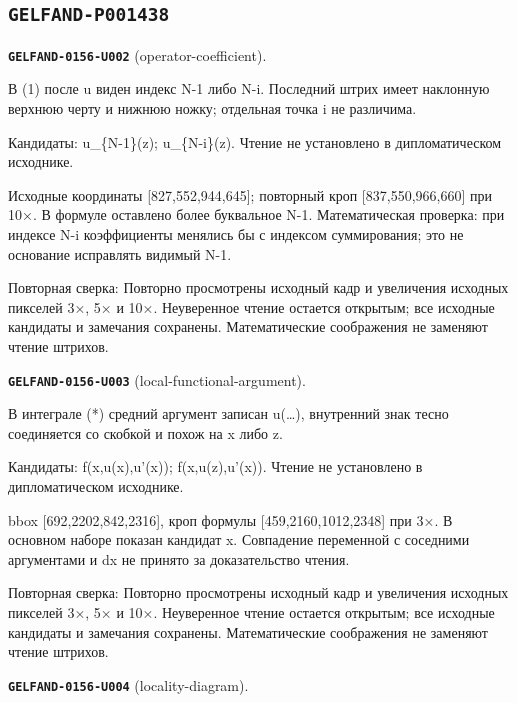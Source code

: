 \subsection*{\texttt{GELFAND-P001438}}
\par\noindent\leavevmode{}\label{GELFAND-0156-U002}\label{GELFAND-P001438:operator-coefficient}\textbf{\texttt{GELFAND-0156-U002}} (operator-coefficient).\nopagebreak[4]\par
В (1) после u виден индекс N-1 либо N-i. Последний штрих имеет наклонную верхнюю черту и нижнюю ножку; отдельная точка i не различима.\par
Кандидаты: u\_\{N-1\}(z); u\_\{N-i\}(z). Чтение не установлено в дипломатическом исходнике.\par
Исходные координаты [827,552,944,645]; повторный кроп [837,550,966,660] при 10×. В формуле оставлено более буквальное N-1. Математическая проверка: при индексе N-i коэффициенты менялись бы с индексом суммирования; это не основание исправлять видимый N-1.\par
Повторная сверка: Повторно просмотрены исходный кадр и увеличения исходных пикселей 3×, 5× и 10×. Неуверенное чтение остается открытым; все исходные кандидаты и замечания сохранены. Математические соображения не заменяют чтение штрихов.\par\medskip
\par\noindent\leavevmode{}\label{GELFAND-0156-U003}\label{GELFAND-P001438:local-functional-argument}\textbf{\texttt{GELFAND-0156-U003}} (local-functional-argument).\nopagebreak[4]\par
В интеграле (*) средний аргумент записан u(…), внутренний знак тесно соединяется со скобкой и похож на x либо z.\par
Кандидаты: f(x,u(x),u'(x)); f(x,u(z),u'(x)). Чтение не установлено в дипломатическом исходнике.\par
bbox [692,2202,842,2316], кроп формулы [459,2160,1012,2348] при 3×. В основном наборе показан кандидат x. Совпадение переменной с соседними аргументами и dx не принято за доказательство чтения.\par
Повторная сверка: Повторно просмотрены исходный кадр и увеличения исходных пикселей 3×, 5× и 10×. Неуверенное чтение остается открытым; все исходные кандидаты и замечания сохранены. Математические соображения не заменяют чтение штрихов.\par\medskip
\par\noindent\leavevmode{}\label{GELFAND-0156-U004}\label{GELFAND-P001438:locality-diagram}\textbf{\texttt{GELFAND-0156-U004}} (locality-diagram).\nopagebreak[4]\par
